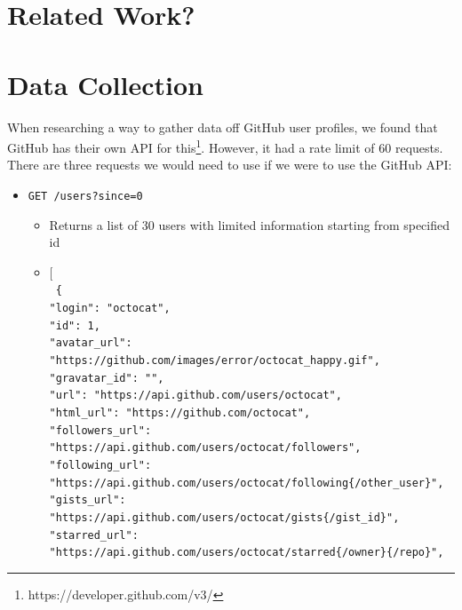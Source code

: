 \documentclass[11pt]{article}
\begin{document}
\section{Related Work?}

\section{Data Collection}

When researching a way to gather data off GitHub user profiles, we found that GitHub has their own API for this\footnote{https://developer.github.com/v3/}. However, it had a rate limit of 60 requests. There are three requests we would need to use if we were to use the GitHub API:

\begin{itemize}
   \item{\texttt{GET /users?since=0}}
   \begin{itemize}
	\item{Returns a list of 30 users with limited information starting from specified id}
	\item{ [\\
	\texttt{
		\{\\
		\textcolor{r}{"login"}: \textcolor{b}{"octocat"},\\
		\textcolor{r}{"id"}: \textcolor{b}{1},\\
		\textcolor{r}{"avatar\_url"}: \textcolor{b}{"https://github.com/images/error/octocat\_happy.gif"},\\
		\textcolor{r}{"gravatar\_id"}: \textcolor{b}{""},\\
		\textcolor{r}{"url"}: \textcolor{b}{"https://api.github.com/users/octocat"},\\
		\textcolor{r}{"html\_url"}: \textcolor{b}{"https://github.com/octocat"},\\
		\textcolor{r}{"followers\_url"}: \\\textcolor{b}{"https://api.github.com/users/octocat/followers"},\\
		\textcolor{r}{"following\_url"}: \\\textcolor{b}{"https://api.github.com/users/octocat/following\{/other\_user\}"},\\
		\textcolor{r}{"gists\_url"}: \\\textcolor{b}{"https://api.github.com/users/octocat/gists\{/gist\_id\}"},\\
		\textcolor{r}{"starred\_url"}: \\\textcolor{b}{"https://api.github.com/users/octocat/starred\{/owner\}\{/repo\}"},\\
}}
\end{itemize}
\end{itemize}
\end{document}
